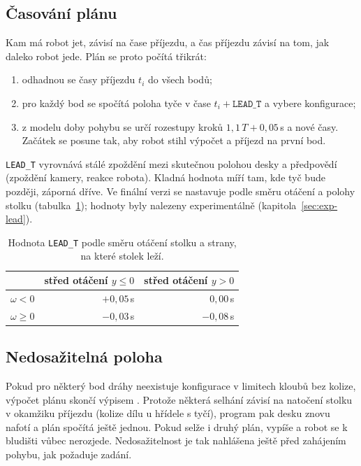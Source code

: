 \documentclass[11pt,a4paper]{article}
\begin{document}
\subsection{Časování plánu}

Kam má robot jet, závisí na čase příjezdu, a čas příjezdu závisí na tom, jak daleko robot
jede. Plán se proto počítá třikrát:
\begin{enumerate}
  \item odhadnou se časy příjezdu $t_i$ do všech bodů;
  \item pro každý bod se spočítá poloha tyče v čase $t_i + \texttt{LEAD\_T}$ a vybere konfigurace;
  \item z modelu doby pohybu se určí rozestupy kroků $1{,}1\,T + 0{,}05$\,s a nové časy.
        Začátek se posune tak, aby robot stihl výpočet a příjezd na první bod.
\end{enumerate}
\texttt{LEAD\_T} vyrovnává stálé zpoždění mezi skutečnou polohou desky a předpovědí
(zpoždění kamery, reakce robota). Kladná hodnota míří tam, kde tyč bude později, záporná
dříve. Ve finální verzi se nastavuje podle směru otáčení a polohy stolku
(tabulka~\ref{tab:lead}); hodnoty byly nalezeny experimentálně (kapitola~\ref{sec:exp-lead}).

\begin{table}[ht]
\centering
\begin{tabular}{@{}l r r@{}}
\toprule
 & střed otáčení $y \le 0$ & střed otáčení $y > 0$ \\
\midrule
$\omega < 0$ & $+0{,}05$\,s & $\phantom{+}0{,}00$\,s \\
$\omega \ge 0$ & $-0{,}03$\,s & $-0{,}08$\,s \\
\bottomrule
\end{tabular}
\caption{Hodnota \texttt{LEAD\_T} podle směru otáčení stolku a strany, na které stolek leží.}
\label{tab:lead}
\end{table}

\subsection{Nedosažitelná poloha}

Pokud pro některý bod dráhy neexistuje konfigurace v limitech kloubů bez kolize, výpočet plánu
skončí výpisem . Protože některá selhání závisí
na natočení stolku v okamžiku příjezdu (kolize dílu u hřídele s tyčí), program pak desku znovu
nafotí a plán spočítá ještě jednou. Pokud selže i druhý plán, vypíše  a robot se k bludišti vůbec nerozjede. Nedosažitelnost
je tak nahlášena ještě před zahájením pohybu, jak požaduje zadání.
\end{document}

